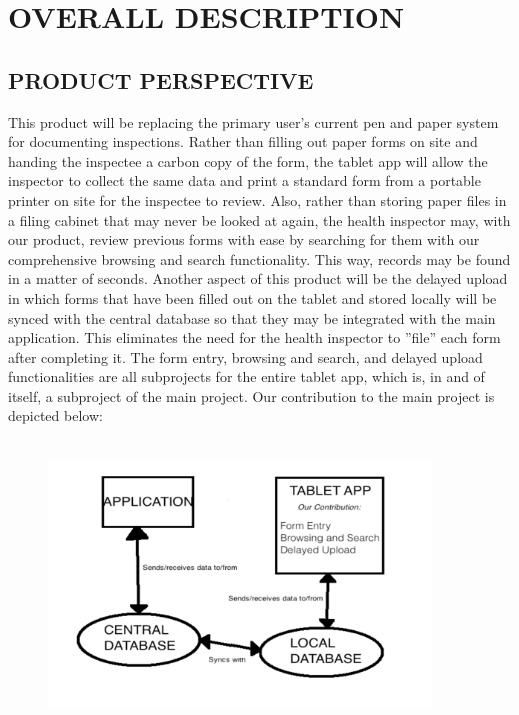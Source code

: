 \documentclass[twoside,letterpaper]{article}
\begin{document}


\clearpage\section[OVERALL
DESCRIPTION]{\rmfamily\bfseries\color{black}
OVERALL DESCRIPTION}

\subsection[PRODUCT
PERSPECTIVE]{\rmfamily\bfseries\color{black}
PRODUCT PERSPECTIVE}
This product will be replacing the primary user's current pen and paper system for documenting inspections. Rather than filling out paper forms on site and handing the inspectee a carbon copy of the form, the tablet app will allow the inspector to collect the same data and print a standard form from a portable printer on site for the inspectee to review. Also, rather than storing paper files in a filing cabinet that may never be looked at again, the health inspector may, with our product, review previous forms with ease by searching for them with our comprehensive browsing and search functionality. This way, records may be found in a matter of seconds. Another aspect of this product will be the delayed upload in which forms that have been filled out on the tablet and stored locally will be synced with the central database so that they may be integrated with the main application. This eliminates the need for the health inspector to ''file'' each form after completing it.
\newline
The form entry, browsing and search, and delayed upload functionalities are all subprojects for the entire tablet app, which is, in and of itself, a subproject of the main project. Our contribution to the main project is depicted below:

\begin{figure}[H]
\centering
\includegraphics[width=4in,height=3in]{Diagram1.png}
\end{figure}
\end{document}
